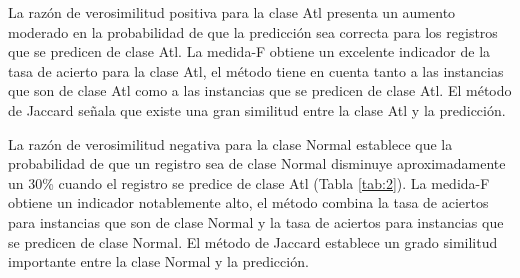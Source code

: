 \bigbreak

La razón de verosimilitud positiva para la clase Atl presenta un aumento moderado en la probabilidad de que la predicción sea correcta para los registros que se predicen de clase Atl. La medida-F obtiene un excelente indicador de la tasa de acierto para la clase Atl, el método tiene en cuenta tanto a las instancias que son de clase Atl como a las instancias que se predicen de clase Atl. El método de Jaccard señala que existe una gran similitud entre la clase Atl y la predicción.

\bigbreak

La razón de verosimilitud negativa para la clase Normal establece que la probabilidad de que un registro sea de clase Normal disminuye aproximadamente un 30\% cuando el registro se predice de clase Atl (Tabla \ref{tab:2}). La medida-F obtiene un indicador notablemente alto, el método combina la tasa de aciertos para instancias que son de clase Normal y la tasa de aciertos para instancias que se predicen de clase Normal. El método de Jaccard establece un grado similitud importante entre la clase Normal y la predicción.


\clearpage

